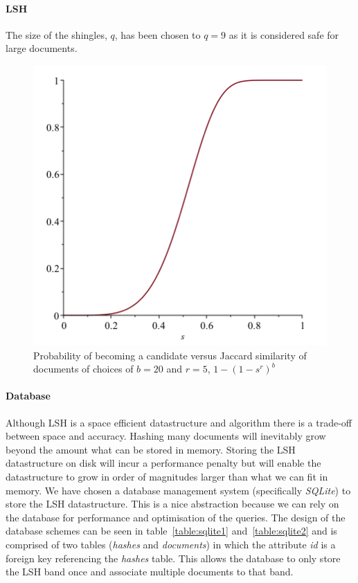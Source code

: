 \paragraph{LSH}

The size of the shingles, $q$, has been chosen to $q=9$ as it is considered safe for large documents.\cite{leskovec2014mining}

\begin{figure}[h]
	\centering
    \includegraphics[width = 0.4\linewidth]{docs/report/input/lsh.png}
    \captionsetup{width = \linewidth}
    \caption{Probability of becoming a candidate versus Jaccard similarity of documents of choices of $b=20$ and $r=5$, $1-(1-s^r)^b$}
    \label{fig:lsh}
\end{figure}

\paragraph{Database}
Although LSH is a space efficient datastructure and algorithm there is a trade-off between space and accuracy. Hashing many documents will inevitably grow beyond the amount what can be stored in memory. Storing the LSH datastructure on disk will incur a performance penalty but will enable the datastructure to grow in order of magnitudes larger than what we can fit in memory. We have chosen a database management system (specifically \emph{SQLite}) to store the LSH datastructure. This is a nice abstraction because we can rely on the database for performance and optimisation of the queries. The design of the database schemes can be seen in table~\ref{table:sqlite1} and~\ref{table:sqlite2} and is comprised of two tables (\emph{hashes} and \emph{documents}) in which the attribute \emph{id} is a foreign key referencing the \emph{hashes} table. This allows the database to only store the LSH band once and associate multiple documents to that band.

